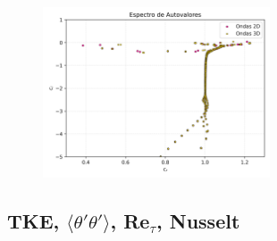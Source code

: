 \begin{figure}[H]
  \centering  

  \caption{}
  \label{fig:eigenfuns4-Re5000-Pr0071}
\end{figure}

\begin{figure}[H]
  \centering
    \includegraphics[width=0.6\textwidth]{figures/cap6/Re5000-Pr071-Ri1Em6/Re5000-Pr071-Ri1Em6_eigenvals.png}
  \caption{}
  \label{fig:spectra-Re5000-Pr0071}
\end{figure}

\subsection{TKE, $\langle \theta' \theta' \rangle$, Re$_{\tau}$, Nusselt }

